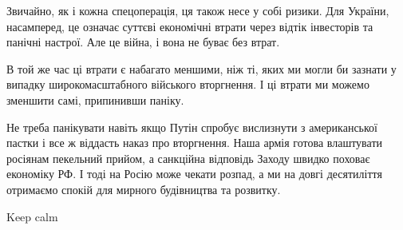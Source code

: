 Звичайно, як і кожна спецоперація, ця також несе у собі ризики. Для України,
насамперед, це означає суттєві економічні втрати через відтік інвесторів та
панічні настрої. Але це війна, і вона не буває без втрат. 

В той же час ці втрати є набагато меншими, ніж ті, яких ми могли би зазнати у
випадку широкомасштабного війського вторгнення. І ці втрати ми можемо зменшити
самі, припинивши паніку. 

Не треба панікувати навіть якщо Путін спробує вислизнути з американської пастки
і все ж віддасть наказ про вторгнення. Наша армія готова влаштувати росіянам
пекельний прийом, а санкційна відповідь Заходу швидко поховає економіку РФ. І
тоді на Росію може чекати розпад, а ми на довгі десятиліття отримаємо спокій
для мирного будівництва та розвитку. 

Keep calm
